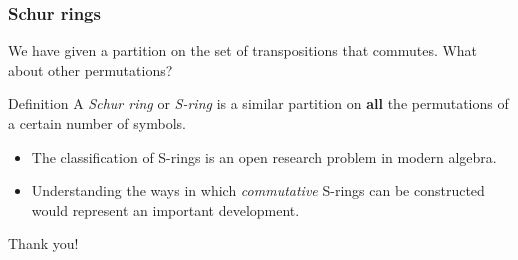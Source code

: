 \documentclass{beamer}
\begin{document}
\begin{frame}
\begin{columns}
{\begin{figure}
\end{figure}}
\end{columns}
\end{frame}

\begin{frame}
\frametitle{Schur rings}
We have given a partition on the set of transpositions that
commutes. What about other permutations?\pause
\begin{block}{Definition}
A \emph{Schur ring} or \emph{S-ring} is a similar partition on
\textbf{all} the permutations of a certain number of symbols.
\end{block}

\pause
\begin{itemize}
\item The classification of S-rings is an open research problem in
  modern algebra.\pause
\item Understanding the ways in which \emph{commutative} S-rings can be
  constructed would represent an important development.
\end{itemize}

\end{frame}
\begin{frame}
\Huge{\centerline{Thank you!}}
\end{frame}

\end{document}
